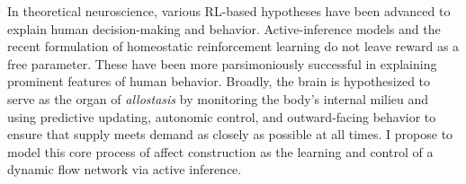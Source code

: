 \begin{singlespace}
\im
In theoretical neuroscience, various RL-based hypotheses have been advanced
to explain human decision-making and behavior.  Active-inference models and
the recent formulation of homeostatic reinforcement learning do not leave
reward as a free parameter\cite{Keramati2014,Pezzulo2018,Morville2018a}.
These have been more parsimoniously successful in explaining prominent
features of human behavior.  Broadly, the brain is hypothesized to serve
as the organ of \emph{allostasis} by monitoring the body's internal milieu
and using predictive updating, autonomic control, and outward-facing
behavior to ensure that supply meets demand as closely as possible at all
times\cite{Barrett2015,BarrettTheoryOfConstructed2017,Kleckner2017}. I
propose to model this core process of affect construction as the learning
and control of a dynamic flow network via active inference.
\end{singlespace}
